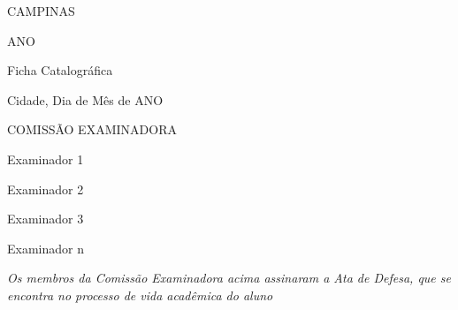 \vspace{\fill}
\begin{center}
CAMPINAS

ANO
\end{center}

\newpage

\thispagestyle{empty}


Ficha Catalográfica

\newpage

\thispagestyle{empty}


\begin{flushright}
Cidade, Dia de Mês de ANO
\end{flushright}

\vspace*{3\baselineskip}

\begin{center}
COMISSÃO EXAMINADORA
\end{center}

\vspace*{3\baselineskip}

\begin{flushleft}
Examinador 1

Examinador 2

Examinador 3

Examinador n
\end{flushleft}

\vspace*{3\baselineskip}

\begin{flushleft}
\textit{Os membros da Comissão Examinadora acima assinaram a Ata de Defesa, que se encontra no processo de vida acadêmica do aluno}
\end{flushleft}

